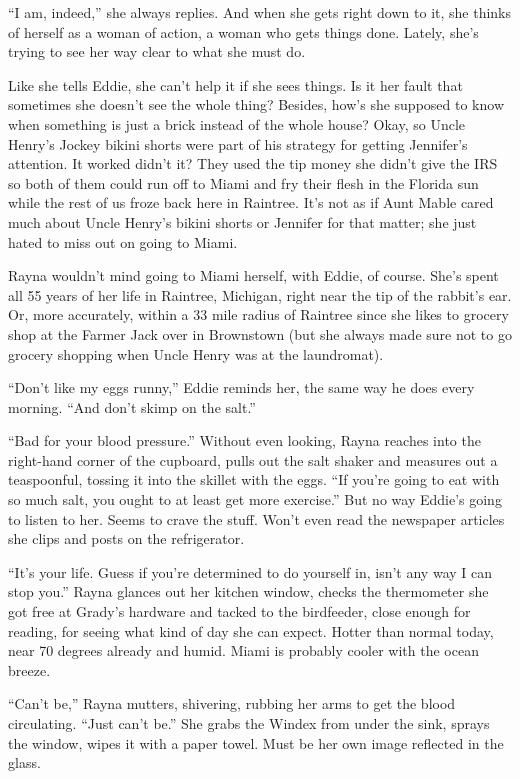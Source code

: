 \documentclass[
]{article}
\begin{document}
``I am, indeed,'' she always replies. And when she gets right down to
it, she thinks of herself as a woman of action, a woman who gets things
done. Lately, she's trying to see her way clear to what she must do.

Like she tells Eddie, she can't help it if she sees things. Is it her
fault that sometimes she doesn't see the whole thing? Besides, how's she
supposed to know when something is just a brick instead of the whole
house? Okay, so Uncle Henry's Jockey bikini shorts were part of his
strategy for getting Jennifer's attention. It worked didn't it? They
used the tip money she didn't give the IRS so both of them could run off
to Miami and fry their flesh in the Florida sun while the rest of us
froze back here in Raintree. It's not as if Aunt Mable cared much about
Uncle Henry's bikini shorts or Jennifer for that matter; she just hated
to miss out on going to Miami.

Rayna wouldn't mind going to Miami herself, with Eddie, of course. She's
spent all 55 years of her life in Raintree, Michigan, right near the tip
of the rabbit's ear. Or, more accurately, within a 33 mile radius of
Raintree since she likes to grocery shop at the Farmer Jack over in
Brownstown (but she always made sure not to go grocery shopping when
Uncle Henry was at the laundromat).

``Don't like my eggs runny,'' Eddie reminds her, the same way he does
every morning. ``And don't skimp on the salt.''

``Bad for your blood pressure.'' Without even looking, Rayna reaches
into the right-hand corner of the cupboard, pulls out the salt shaker
and measures out a teaspoonful, tossing it into the skillet with the
eggs. ``If you're going to eat with so much salt, you ought to at least
get more exercise.'' But no way Eddie's going to listen to her. Seems to
crave the stuff. Won't even read the newspaper articles she clips and
posts on the refrigerator.

``It's your life. Guess if you're determined to do yourself in, isn't
any way I can stop you.'' Rayna glances out her kitchen window, checks
the thermometer she got free at Grady's hardware and tacked to the
birdfeeder, close enough for reading, for seeing what kind of day she
can expect. Hotter than normal today, near 70 degrees already and humid.
Miami is probably cooler with the ocean breeze.

``Can't be,'' Rayna mutters, shivering, rubbing her arms to get the
blood circulating. ``Just can't be.'' She grabs the Windex from under
the sink, sprays the window, wipes it with a paper towel. Must be her
own image reflected in the glass.
\end{document}
